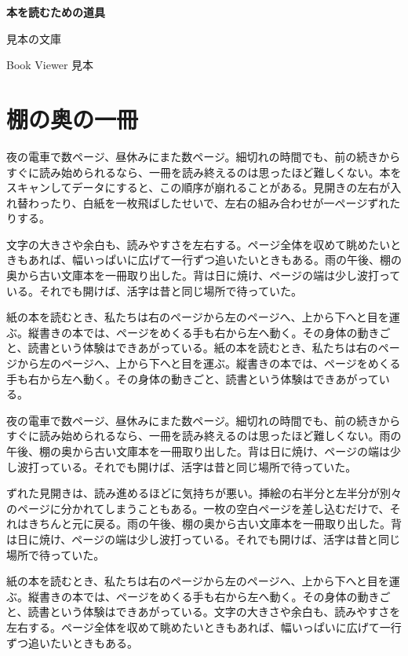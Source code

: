 \documentclass[a5paper,11pt]{ltjtbook}
\begin{document}
\thispagestyle{empty}
\vspace*{3zw}
{\Huge\bfseries 本を読むための道具}\par\vspace{2zw}
{\Large 見本の文庫}\par\vspace{8zw}
{\large Book Viewer 見本}
\clearpage
\chapter{棚の奥の一冊}
夜の電車で数ページ、昼休みにまた数ページ。細切れの時間でも、前の続きからすぐに読み始められるなら、一冊を読み終えるのは思ったほど難しくない。本をスキャンしてデータにすると、この順序が崩れることがある。見開きの左右が入れ替わったり、白紙を一枚飛ばしたせいで、左右の組み合わせが一ページずれたりする。

文字の大きさや余白も、読みやすさを左右する。ページ全体を収めて眺めたいときもあれば、幅いっぱいに広げて一行ずつ追いたいときもある。雨の午後、棚の奥から古い文庫本を一冊取り出した。背は日に焼け、ページの端は少し波打っている。それでも開けば、活字は昔と同じ場所で待っていた。

紙の本を読むとき、私たちは右のページから左のページへ、上から下へと目を運ぶ。縦書きの本では、ページをめくる手も右から左へ動く。その身体の動きごと、読書という体験はできあがっている。紙の本を読むとき、私たちは右のページから左のページへ、上から下へと目を運ぶ。縦書きの本では、ページをめくる手も右から左へ動く。その身体の動きごと、読書という体験はできあがっている。

夜の電車で数ページ、昼休みにまた数ページ。細切れの時間でも、前の続きからすぐに読み始められるなら、一冊を読み終えるのは思ったほど難しくない。雨の午後、棚の奥から古い文庫本を一冊取り出した。背は日に焼け、ページの端は少し波打っている。それでも開けば、活字は昔と同じ場所で待っていた。

ずれた見開きは、読み進めるほどに気持ちが悪い。挿絵の右半分と左半分が別々のページに分かれてしまうこともある。一枚の空白ページを差し込むだけで、それはきちんと元に戻る。雨の午後、棚の奥から古い文庫本を一冊取り出した。背は日に焼け、ページの端は少し波打っている。それでも開けば、活字は昔と同じ場所で待っていた。

紙の本を読むとき、私たちは右のページから左のページへ、上から下へと目を運ぶ。縦書きの本では、ページをめくる手も右から左へ動く。その身体の動きごと、読書という体験はできあがっている。文字の大きさや余白も、読みやすさを左右する。ページ全体を収めて眺めたいときもあれば、幅いっぱいに広げて一行ずつ追いたいときもある。
\end{document}
